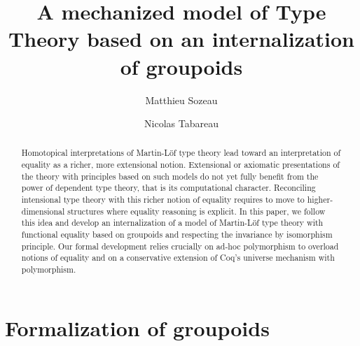\documentclass[runningheads,a4paper]{llncs}
\begin{document}
\mainmatter  %

\title{A mechanized model of Type Theory based on an
  internalization of groupoids}

\author{Matthieu Sozeau \and Nicolas Tabareau}

\date{}



\def\mathrm#1{#1}

\maketitle

\begin{abstract}
  Homotopical interpretations of Martin-Löf type theory lead toward an
  interpretation of equality as a richer, more extensional
  notion. Extensional or axiomatic presentations of the theory with
  principles based on such models do not yet fully benefit from the
  power of dependent type theory, that is its computational
  character. Reconciling intensional type theory with this richer
  notion of equality requires to move to higher-dimensional structures
  where equality reasoning is explicit. In this paper, we follow this
  idea and develop an internalization of a model of Martin-Löf type
  theory with functional equality based on groupoids and respecting
  the invariance by isomorphism principle.
  Our formal development relies crucially on ad-hoc polymorphism to
  overload notions of equality and on a conservative extension of
  Coq's universe mechanism with polymorphism.
\end{abstract}







\section{Formalization of groupoids}
\label{sec:formalization}
\end{document}
